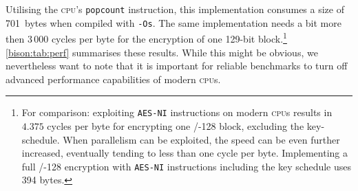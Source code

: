 Utilising the \textsc{cpu}'s \texttt{popcount} instruction, this implementation consumes a size of 701~bytes when compiled with \texttt{-Os}.
The same implementation needs a bit more then 3\,000 cycles per byte for the encryption of one 129-bit block.\footnote{%
    For comparison: exploiting \texttt{AES-NI} instructions on modern \textsc{cpu}s results in $4.375$ cycles per byte for encrypting one \AES/-128 block, excluding the key-schedule.
    When parallelism can be exploited, the speed can be even further increased, eventually tending to less than one cycle per byte.
    Implementing a full \AES/-128 encryption with \texttt{AES-NI} instructions including the key schedule uses 394 bytes.
}
\cref{bison:tab:perf} summarises these results.
While this might be obvious, we nevertheless want to note that it is important for reliable benchmarks to turn off advanced performance capabilities of modern \textsc{cpu}s.


